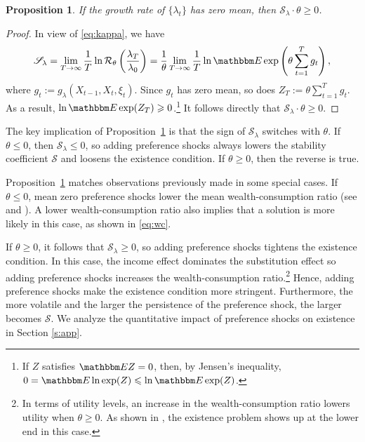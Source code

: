 \documentclass[12pt, reqno]{amsart}
\renewcommand{\leq}{\leqslant}
\renewcommand{\geq}{\geqslant}
\newcommand{\1}{\mathbbm 1}
\newcommand{\rR}{\mathcal R}
\newcommand{\sS}{\mathscr S}
\newcommand{\EE}{\mathbbm E}
\theoremstyle{plain}
\newtheorem{proposition}[theorem]{Proposition}
\theoremstyle{definition}
\begin{document}
\begin{proposition}\label{p:ss}
    If the growth rate of $\{\lambda_t\}$ has zero mean, then $\sS_\lambda \cdot \theta  \geq 0$.
\end{proposition}

\begin{proof}
    In view of \eqref{eq:kappa}, we have
    \begin{equation*}
        \sS_\lambda 
        = \lim_{T \to \infty} \frac{1}{T}
            \ln \rR_\theta \left( \frac{\lambda_T}{\lambda_0} \right)
        =  \frac{1}{\theta}
             \lim_{T \to \infty} \frac{1}{T}
             \ln \EE \exp \left( \theta \sum_{t=1}^T g_t \right),
    \end{equation*}
    where $g_t := g_\lambda(X_{t-1}, X_t, \xi_t)$.  Since $g_t$ has zero mean,
    so does $Z_T := \theta \sum_{t=1}^T g_t$.  As a result, $\ln \EE \exp
    (Z_T) \geq 0$.\footnote{If $Z$ satisfies $\EE Z = 0$,
        then, by Jensen's inequality, $0 = \EE \ln \exp(Z) \leq \ln \EE
    \exp(Z)$.}  It follows directly that $\sS_\lambda \cdot \theta  \geq 0$.
\end{proof}
%
The key implication of Proposition~\ref{p:ss} is that the sign of
$\sS_\lambda$ switches with $\theta$.  If $\theta \leq 0$, then $\sS_\lambda
\leq 0$, so adding preference shocks always lowers the stability coefficient
$\sS$ and loosens the existence condition.  If $\theta \geq 0$, then the
reverse is true.

Proposition~\ref{p:ss} matches observations previously made in some special
cases.  If $\theta \leq 0$, mean zero preference shocks lower the mean
wealth-consumption ratio  (see \cite{Albuquerque2016} and
\cite{schorfheide2018identifying}).  A lower wealth-consumption ratio also
implies that a solution is more likely in this case, as shown in \eqref{eq:wc}.

If $\theta \geq 0$, it follows that $\sS_\lambda \geq 0$, so adding
preference shocks tightens the existence condition. In this case, the income
effect dominates the substitution effect so adding preference shocks
increases the wealth-consumption ratio.\footnote{In terms of utility levels,
  an increase in the wealth-consumption ratio lowers utility when $\theta
  \geq 0$. As shown in \cite{Pohl2019}, the existence problem shows up at the
  lower end in this case.} Hence, adding preference shocks make the existence
condition more stringent. Furthermore, the more volatile and the larger the
persistence of the preference shock, the larger becomes $\sS$. We analyze the
quantitative impact of preference shocks on existence in Section \ref{s:app}.
\end{document}
